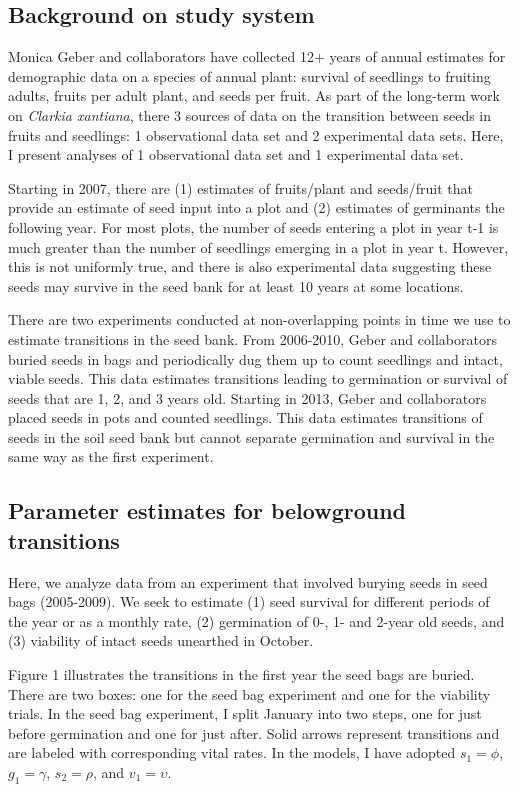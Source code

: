 \documentclass[12pt, oneside, titlepage]{article}   	%
\begin{document}
\subsection*{Background on study system}

Monica Geber and collaborators have collected 12+ years of annual estimates for demographic data on a species of annual plant: survival of seedlings to fruiting adults, fruits per adult plant, and seeds per fruit. As part of the long-term work on \textit{Clarkia xantiana}, there 3 sources of data on the transition between seeds in fruits and seedlings: 1 observational data set and 2 experimental data sets. Here, I present analyses of 1 observational data set and 1 experimental data set. 

Starting in 2007, there are (1) estimates of fruits/plant and seeds/fruit that provide an estimate of seed input into a plot and (2) estimates of germinants the following year. For most plots, the number of seeds entering a plot in year t-1 is much greater than the number of seedlings emerging in a plot in year t. However, this is not uniformly true, and there is also experimental data suggesting these seeds may survive in the seed bank for at least 10 years at some locations.

There are two experiments conducted at non-overlapping points in time we use to estimate transitions in the seed bank. From 2006-2010, Geber and collaborators buried seeds in bags and periodically dug them up to count seedlings and intact, viable seeds. This data estimates transitions leading to germination or survival of seeds that are 1, 2, and 3 years old. Starting in 2013, Geber and collaborators placed seeds in pots and counted seedlings. This data estimates transitions of seeds in the soil seed bank but cannot separate germination and survival in the same way as the first experiment.

\subsection*{Parameter estimates for belowground transitions}

Here, we analyze data from an experiment that involved burying seeds in seed bags (2005-2009). We seek to estimate (1) seed survival for different periods of the year or as a monthly rate, (2) germination of 0-, 1- and 2-year old seeds, and (3) viability of intact seeds unearthed in October. 

Figure 1 illustrates the transitions in the first year the seed bags are buried. There are two boxes: one for the seed bag experiment and one for the viability trials. In the seed bag experiment, I split January into two steps, one for just before germination and one for just after. Solid arrows represent transitions and are labeled with corresponding vital rates. In the models, I have adopted $s_1 = \phi$, $g_1=\gamma$, $s_2 = \rho$, and $v_1 = \upsilon$. 
 
\end{document}
